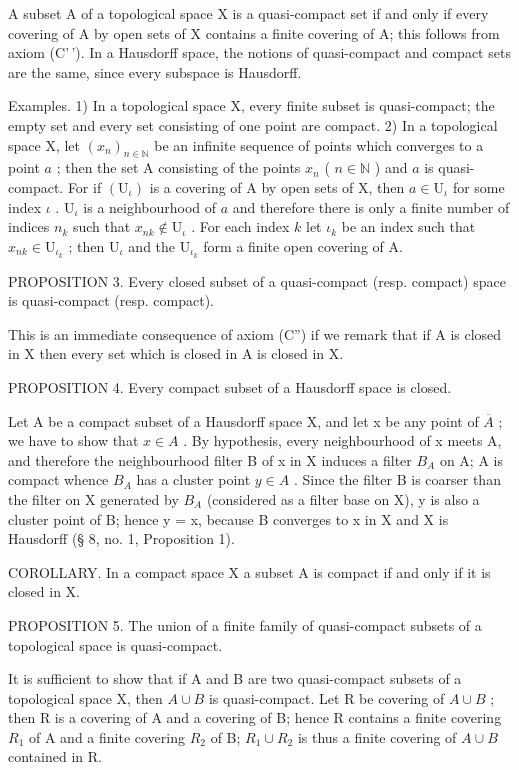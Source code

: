 A subset A of a topological space X is a quasi-compact set if and only if every covering of A by open sets of X contains a finite covering of A; this follows from axiom (C'\,'). In a Hausdorff space, the notions of quasi-compact and compact sets are the same, since every subspace is Hausdorff.

Examples. 1) In a topological space X, every finite subset is quasi-compact; the empty set and every set consisting of one point are compact. 2) In a topological space X, let \((x_{n})_{n\in \mathbb{N}}\) be an infinite sequence of points which converges to a point \(a\) ; then the set A consisting of the points \(x_{n}\) ( \(n\in \mathbb{N}\) ) and \(a\) is quasi-compact. For if \((\mathrm{U}_{\iota})\) is a covering of A by open sets of X, then \(a\in \mathrm{U}_{\iota}\) for some index \(\iota\) . \(\mathrm{U}_{\iota}\) is a neighbourhood of \(a\) and therefore there is only a finite number of indices \(n_k\) such that \(x_{nk}\notin \mathrm{U}_{\iota}\) . For each index \(k\) let \(\iota_{k}\) be an index such that \(x_{nk}\in \mathrm{U}_{\iota_{k}}\) ; then \(\mathrm{U}_{\iota}\) and the \(\mathrm{U}_{\iota_{k}}\) form a finite open covering of A.

PROPOSITION 3. Every closed subset of a quasi-compact (resp. compact) space is quasi-compact (resp. compact).

This is an immediate consequence of axiom (C'') if we remark that if A is closed in X then every set which is closed in A is closed in X.

PROPOSITION 4. Every compact subset of a Hausdorff space is closed.

Let A be a compact subset of a Hausdorff space X, and let x be any point of \(\overline{A}\) ; we have to show that \(x \in A\) . By hypothesis, every neighbourhood of x meets A, and therefore the neighbourhood filter B of x in X induces a filter \(B_{A}\) on A; A is compact whence \(B_{A}\) has a cluster point \(y \in A\) . Since the filter B is coarser than the filter on X generated by \(B_{A}\) (considered as a filter base on X), y is also a cluster point of B; hence y = x, because B converges to x in X and X is Hausdorff (§ 8, no. 1, Proposition 1).

COROLLARY. In a compact space X a subset A is compact if and only if it is closed in X.

PROPOSITION 5. The union of a finite family of quasi-compact subsets of a topological space is quasi-compact.

It is sufficient to show that if A and B are two quasi-compact subsets of a topological space X, then \(A \cup B\) is quasi-compact. Let R be covering of \(A \cup B\) ; then R is a covering of A and a covering of B; hence R contains a finite covering \(R_{1}\) of A and a finite covering \(R_{2}\) of B; \(R_{1} \cup R_{2}\) is thus a finite covering of \(A \cup B\) contained in R.

